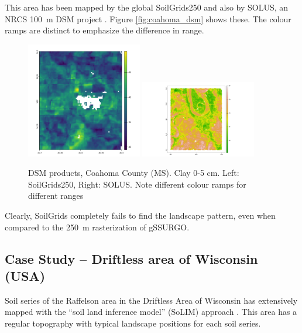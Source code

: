 \documentclass[soil, manuscript]{copernicus}
\begin{document}
This area has been mapped by the global SoilGrids250 and also by SOLUS, an NRCS 100~m DSM project \citet{naumanSoilLandscapesUnited2024,naumanDataSoilLandscapes2024}.
%
Figure \ref{fig:coahoma_dsm} shows these. The colour ramps are distinct to emphasize the difference in range.

\begin{figure}
  \includegraphics[width=0.45\textwidth]{sg250_clay_05.png}
  \hfill
  \includegraphics[width=0.45\textwidth]{solus_clay_05.png} 
 \caption{DSM products, Coahoma County (MS). Clay 0-5 cm. Left: SoilGrids250, Right: SOLUS. Note different colour ramps for different ranges}
  \label{fig:coahoma}
\end{figure}

\par
Clearly, SoilGrids completely fails to find the landscape pattern, even when compared to the 250~m rasterization of gSSURGO.


\subsection{Case Study -- Driftless area of Wisconsin (USA)}

Soil series of the Raffelson  area in the Driftless Area of Wisconsin has extensively mapped with the ``soil land inference model'' (SoLIM) approach \citep{Zhu.etal2001,zhuPredictionSoilProperties2010}.
%
This area has a regular topography with typical landscape positions for each soil series.
\end{document}
